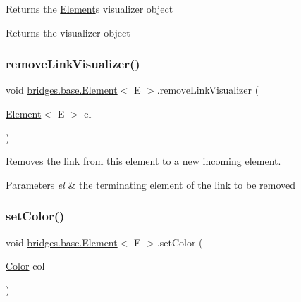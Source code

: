 Returns the \hyperlink{classbridges_1_1base_1_1_element}{Element}\textquotesingle{}s visualizer object

\begin{DoxyReturn}{Returns}
the visualizer object 
\end{DoxyReturn}
\mbox{\label{classbridges_1_1base_1_1_element_a144cd54e043a801fab326769a5da01e2}} 
\subsubsection{\texorpdfstring{remove\+Link\+Visualizer()}{removeLinkVisualizer()}}
{\footnotesize\ttfamily void \hyperlink{classbridges_1_1base_1_1_element}{bridges.\+base.\+Element}$<$ E $>$.remove\+Link\+Visualizer (\begin{DoxyParamCaption}\item[{\hyperlink{classbridges_1_1base_1_1_element}{Element}$<$ E $>$}]{el }\end{DoxyParamCaption})\hspace{0.3cm}{\ttfamily [protected]}}



Removes the link from this element to a new incoming element. 


\begin{DoxyParams}{Parameters}
{\em el} & the terminating element of the link to be removed \\
\hline
\end{DoxyParams}
\mbox{\label{classbridges_1_1base_1_1_element_aeb3336746d41a180e50b5efaff2dedc2}} 
\subsubsection{\texorpdfstring{set\+Color()}{setColor()}\hspace{0.1cm}{\footnotesize\ttfamily [1/2]}}
{\footnotesize\ttfamily void \hyperlink{classbridges_1_1base_1_1_element}{bridges.\+base.\+Element}$<$ E $>$.set\+Color (\begin{DoxyParamCaption}\item[{\hyperlink{classbridges_1_1base_1_1_color}{Color}}]{col }\end{DoxyParamCaption})}


